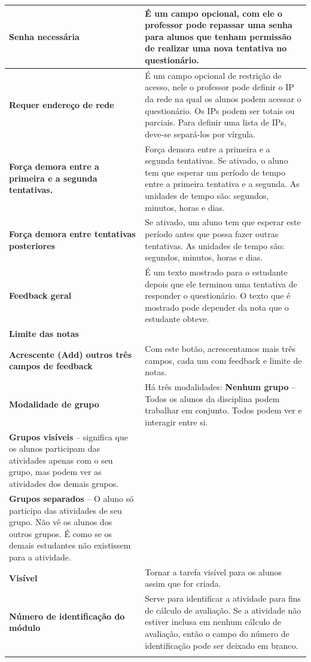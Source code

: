 \begin{longtable}{p{6cm}|p{9cm}}
    \textbf{Senha necessária}                                          & É um campo opcional, com ele o professor pode repassar uma senha para alunos que tenham permissão de realizar uma nova tentativa no questionário.\\\hline
    \textbf{Requer endereço de rede}                                   &É um campo opcional de restrição de acesso, nele o professor pode definir o IP da rede na qual os alunos podem acessar o questionário. Os IPs podem ser totais ou parciais. Para definir uma lista de IPs, deve-se separá-los por vírgula.\\\hline
    \textbf{Força demora entre a primeira e a segunda tentativas.}     &Força demora entre a primeira e a segunda tentativas.	Se ativado, o aluno tem que esperar um período de tempo entre a primeira tentativa e a segunda. As unidades de tempo são: segundos, minutos, horas e dias.\\\hline
    \textbf{Força demora entre tentativas posteriores}                 &Se ativado, um aluno tem que esperar este período antes que possa fazer outras tentativas. As unidades de tempo são: segundos, minutos, horas e dias.\\\hline
    \textbf{Feedback geral}                                            &É um texto mostrado para o estudante depois que ele terminou uma tentativa de responder o questionário. O texto que é mostrado pode depender da nota que o estudante obteve.\\\hline
    \textbf{Limite das notas}                                          &\\\hline
    \textbf{Acrescente (Add) outros três campos de feedback}           &Com este botão, acrescentamos mais três campos, cada um com feedback e limite de notas.\\\hline
    \textbf{Modalidade de grupo}                                       &Há três modalidades:
\textbf{Nenhum grupo} – Todos os alunos da disciplina podem trabalhar em conjunto. Todos podem ver e interagir entre si.\\
\textbf{Grupos visíveis} – significa que os alunos participam das atividades apenas com o seu grupo, mas podem ver as atividades dos demais grupos.\\
\textbf{Grupos separados} – O aluno só participa das atividades de seu grupo. Não vê os alunos dos outros grupos. É como se os demais estudantes não existissem para a atividade.\\\hline
    \textbf{Visível}                                                   &Tornar a tarefa visível para os alunos assim que for criada.\\\hline
    \textbf{Número de identificação do módulo}                         &Serve para identificar a atividade para fins de cálculo de avaliação. Se a atividade não estiver inclusa em nenhum cálculo de avaliação, então o campo do número de identificação pode ser deixado em branco.\\\hline
  \label{tab:ConfDisciplina}
  \end{longtable}
  
